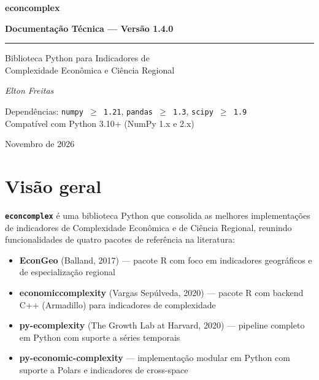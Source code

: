 \documentclass[12pt, a4paper]{article}
\newcommand{\pkg}[1]{\texttt{\textbf{#1}}}
\begin{document}
\begin{titlepage}
  \centering
  \vspace*{3cm}
  {\Huge\bfseries\color{tblhead} econcomplex}\par
  \vspace{0.5cm}
  {\large\bfseries Documenta\c{c}\~{a}o T\'{e}cnica --- Vers\~{a}o 1.4.0}\par
  \vspace{1cm}
  \rule{10cm}{0.8pt}\par
  \vspace{0.8cm}
  {\large Biblioteca Python para Indicadores de\\
  Complexidade Econ\^{o}mica e Ci\^{e}ncia Regional}\par
  \vspace{2cm}
  {\normalsize
    \textit{Elton Freitas}
  }\par
  \vspace{3cm}
  {\small\color{pygray}
    Depend\^{e}ncias: \texttt{numpy $\geq$ 1.21}, \texttt{pandas $\geq$ 1.3}, \texttt{scipy $\geq$ 1.9}\\[4pt]
    Compat\'{i}vel com Python 3.10+ (NumPy 1.x e 2.x)
  }\par
  \vfill
  {\small\color{pygray} Novembro de 2026}
\end{titlepage}

\tableofcontents
\newpage

\section{Vis\~{a}o geral}

\pkg{econcomplex} \'{e} uma biblioteca Python que consolida as melhores
implementa\c{c}\~{o}es de indicadores de Complexidade Econ\^{o}mica e de
Ci\^{e}ncia Regional, reunindo funcionalidades de quatro pacotes de
refer\^{e}ncia na literatura:

\begin{itemize}[leftmargin=1.5em]
  \item \textbf{EconGeo} (Balland, 2017) --- pacote R com foco em indicadores
        geogr\'{a}ficos e de especializa\c{c}\~{a}o regional
  \item \textbf{economiccomplexity} (Vargas Sep\'{u}lveda, 2020) --- pacote R
        com backend C++ (Armadillo) para indicadores de complexidade
  \item \textbf{py-ecomplexity} (The Growth Lab at Harvard, 2020) --- pipeline
        completo em Python com suporte a s\'{e}ries temporais
  \item \textbf{py-economic-complexity} --- implementa\c{c}\~{a}o modular em
        Python com suporte a Polars e indicadores de cross-space
\end{itemize}
\end{document}
